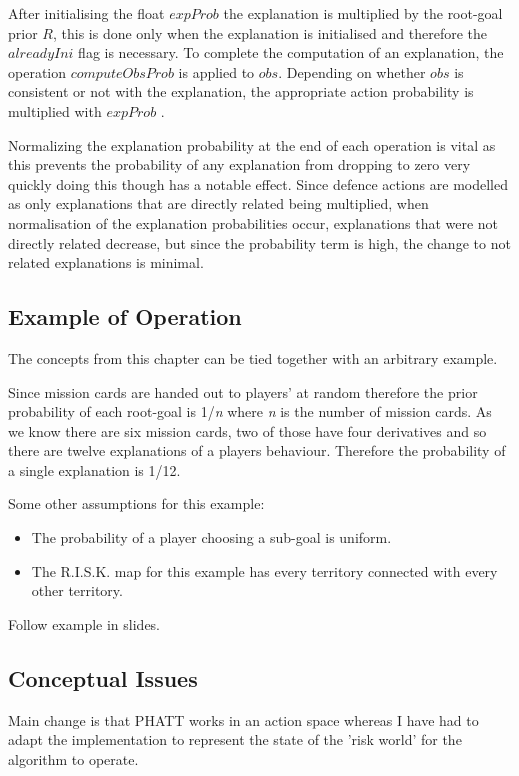 \documentclass[parskip]{cs4rep}
\begin{document}
After initialising the float $expProb$ the explanation is multiplied by the root-goal prior $R$, this is done only when the explanation is initialised and therefore the $alreadyIni$ flag is necessary. To complete the computation of an explanation, the operation $computeObsProb$ is applied to $obs$. Depending on whether $obs$ is consistent or not with the explanation, the appropriate action probability is multiplied with $expProb$ .

Normalizing the explanation probability at the end of each operation is vital as this prevents the probability of any explanation from dropping to zero very quickly doing this though has a notable effect. Since defence actions are modelled as only explanations that are directly related being multiplied, when normalisation of the explanation probabilities occur, explanations that were not directly related decrease, but since the probability term is high, the change to not related explanations is minimal. 

\subsection{Example of Operation}

The concepts from this chapter can be tied together with an arbitrary example.

Since mission cards are handed out to players' at random therefore the prior probability of each root-goal is 1/\textit{n} where \textit{n} is the number of mission cards. As we know there are six mission cards, two of those have four derivatives and so there are twelve explanations of a players behaviour. Therefore the probability of a single explanation is 1/12.

Some other assumptions for this example:

\begin{itemize}
\item
The probability of a player choosing a sub-goal is uniform.
\item
The R.I.S.K. map for this example has every territory connected with every other territory.
\end{itemize}

Follow example in slides.

\subsection{Conceptual Issues}

Main change is that PHATT works in an action space whereas I have had to adapt the implementation to represent the state of the 'risk world' for the algorithm to operate.
\end{document}
